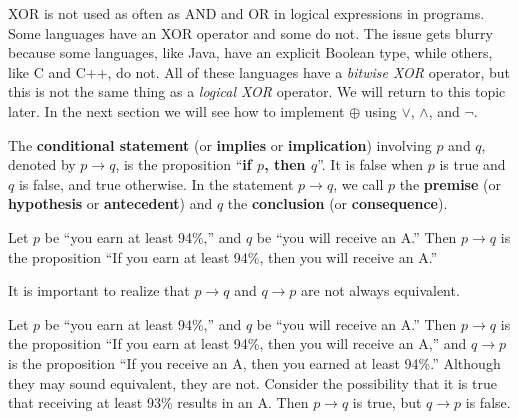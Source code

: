 \newpage

XOR is not used as often as AND and OR in logical expressions in programs.  
Some languages have an XOR operator and some do not.  
The issue gets blurry because some languages, like Java, have an explicit Boolean type, 
while others, like C and C++, do not.
All of these languages have a {\em bitwise XOR} operator, but this is not the same thing as a
{\em logical XOR} operator. We will return to this topic later.
In the next section we will see how to implement $\oplus$ using $\vee$, $\wedge$, and $\neg$.

\begin{df}
The {\bf conditional statement} (or {\bf implies} or {\bf implication}) involving $p$ and $q$,
denoted by \boldmath$p \rightarrow q$, is the proposition ``{\bf if \boldmath$p$, then \boldmath$q$}''.
It is false when $p$ is true and $q$ is false, and true otherwise.
In the statement $p \rightarrow q$, we call $p$ the {\bf premise} (or {\bf hypothesis} or {\bf antecedent})
and $q$ the {\bf conclusion} (or {\bf consequence}).
\end{df}

\begin{exa}
Let $p$ be ``you earn at least 94\%,'' and $q$ be ``you will receive an A.''
Then $p\rightarrow q$ is the proposition ``If you earn at least 94\%, then you will receive an A.''
\end{exa}

It is important to realize that $p\rightarrow q$ and $q\rightarrow p$ are not always equivalent.

\begin{exa}
Let $p$ be ``you earn at least 94\%,'' 
and $q$ be ``you will receive an A.''
Then $p\rightarrow q$ is the proposition ``If you earn at least 94\%, then you will receive an A,'' and 
$q\rightarrow p$ is the proposition ``If you receive an A, then you earned at least 94\%.'' Although they may sound equivalent, they are not. 
Consider the possibility that it is true that receiving at least 93\% results in an A. Then $p\rightarrow q$ is true, but $q\rightarrow p$ is false.
\end{exa}

